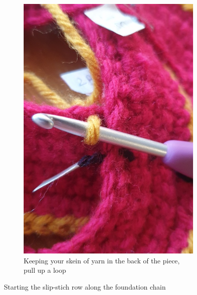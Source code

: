 \documentclass[openany]{book}
\begin{document}
\begin{figure}[H]
\begin{subfigure}[t]{.45\textwidth}
		\includegraphics[width=.95\textwidth]{bk/top2}
\caption{Keeping your skein of yarn in the back of the piece, pull up a loop}
\end{subfigure}
\caption{Starting the slip-stich row along the foundation chain}
\end{figure}

\end{document}
